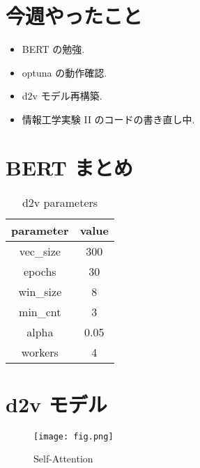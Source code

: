 \documentclass[twocolumn]{jarticle}     %
\begin{document}

\section{今週やったこと}
\begin{itemize}
  \item BERT の勉強.
  \item optuna の動作確認.
  \item d2v モデル再構築.
  \item 情報工学実験 II のコードの書き直し中.
\end{itemize}

\section{BERT まとめ}


\begin{table}[htb]
\begin{center}
\caption{d2v parameters}
\begin{tabular}{|c|c|}
\hline
parameter & value \\ \hline
vec\_size & 300   \\
epochs    & 30    \\
win\_size & 8     \\
min\_cnt  & 3     \\
alpha     & 0.05  \\
workers   & 4     \\ \hline
\end{tabular}
\label{tab:d2v}
\end{center}
\end{table}

\section{d2v モデル}

\begin{figure}[htb]
  \begin{center} %
    \texttt{[image: fig.png]}
    \caption{Self-Attention} %
    \label{fig:sa} %
  \end{center}
\end{figure}
\end{document}
